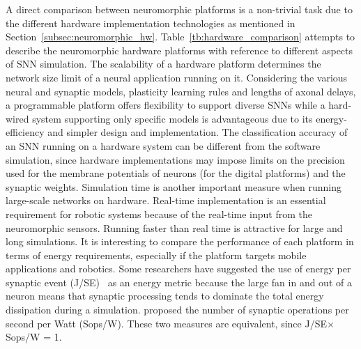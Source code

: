 A direct comparison between neuromorphic platforms is a non-trivial task due to the different hardware implementation technologies as mentioned in Section~\ref{subsec:neuromorphic_hw}.
Table~\ref{tb:hardware_comparison} attempts to describe the neuromorphic hardware platforms with reference to different aspects of SNN simulation.
The scalability of a hardware platform determines the network size limit of a neural application running on it.
Considering the various neural and synaptic models, plasticity learning rules and lengths of axonal delays, a programmable platform offers flexibility to support diverse SNNs while a hard-wired system supporting only specific models is advantageous due to its energy-efficiency and simpler design and implementation.
The classification accuracy of an SNN running on a hardware system can be different from the software simulation, since hardware implementations may impose limits on the precision used for the membrane potentials of neurons (for the digital platforms) and the synaptic weights.
Simulation time is another important measure when running large-scale networks on hardware.
Real-time implementation is an essential requirement for robotic systems because of the real-time input from the neuromorphic sensors.
Running faster than real time is attractive for large and long simulations.
It is interesting to compare the performance of each platform in terms of energy requirements, especially if the platform targets mobile applications and robotics.
Some researchers have suggested the use of energy per synaptic event (J/SE)~\cite{sharp2012power,stromatias2013power} as an energy metric because the large fan in and out of a neuron means that synaptic processing tends to dominate the total energy dissipation during a simulation.
\cite{merolla2014million} proposed the number of synaptic operations per second per Watt (Sops/W).
These two measures are equivalent, since J/SE$\times$Sops/W = 1.

